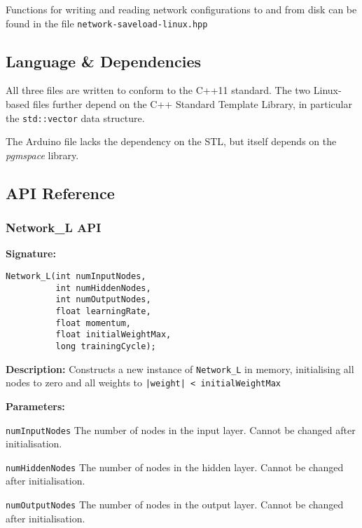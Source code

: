 \documentclass[a4paper]{article}
\begin{document}
Functions for writing and reading network configurations to and from disk can be found in the file \lstinline{network-saveload-linux.hpp}

\subsection{Language \& Dependencies}%

All three files are written to conform to the C++11 standard\cite{nnref0}. The two Linux-based files further depend on the C++ Standard Template Library, in particular the \lstinline{std::vector} data structure.

The Arduino file lacks the dependency on the STL, but itself depends on the \textit{pgmspace} library.\cite{nnref1}

\subsection{API Reference}%

\subsubsection{Network\_L API}%

\hrulefill %

\textbf{Signature:} \begin{lstlisting} 
Network_L(int numInputNodes,
          int numHiddenNodes,
          int numOutputNodes,
          float learningRate,
          float momentum,
          float initialWeightMax,
          long trainingCycle);
\end{lstlisting}

\textbf{Description: }
Constructs a new instance of \lstinline{Network_L} in memory, initialising all nodes to zero and all weights to \lstinline{|weight| < initialWeightMax}

\textbf{Parameters: }

\lstinline{numInputNodes} The number of nodes in the input layer. Cannot be changed after initialisation.

\lstinline{numHiddenNodes} The number of nodes in the hidden layer. Cannot be changed after initialisation.

\lstinline{numOutputNodes} The number of nodes in the output layer. Cannot be changed after initialisation.
\end{document}
